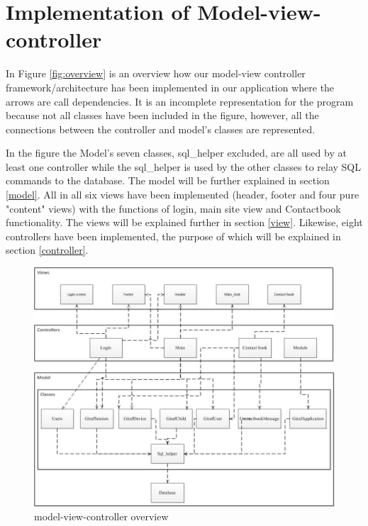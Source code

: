 \section{Implementation of Model-view-controller}
In Figure \vref{fig:overview} is an overview how our model-view controller framework/architecture has been implemented in our application where the arrows are call dependencies. It is an incomplete representation for the program because not all classes have been included in the figure, however, all the connections between the controller and model's classes are represented. 

In the figure the Model's seven classes, sql\_helper excluded, are all used by at least one controller while the sql\_helper is used by the other classes to relay SQL commands to the database. The model will be further explained in section \vref{model}. All in all six views have been implemented (header, footer and four pure "content" views) with the functions of login, main site view and Contactbook functionality. The views will be explained further in section \vref{view}. Likewise, eight controllers have been implemented, the purpose of which will be explained in section \vref{controller}.

\begin{figure}
	\centering
		\includegraphics[width=1.00\textwidth]{img/overview.jpg}
	\caption{model-view-controller overview}
	\label{fig:overview}
\end{figure}
